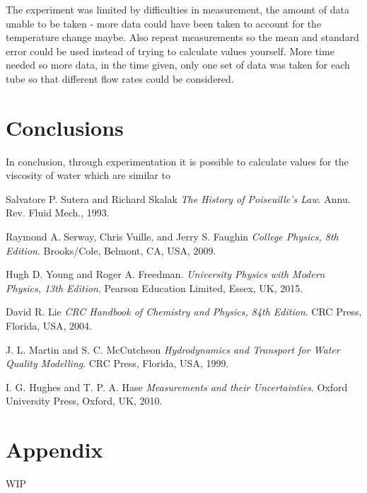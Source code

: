 \documentclass[twocolumn]{revtex4}
\begin{document}
The experiment was limited by difficulties in measurement, the amount of data unable to be taken - more data could have been taken to account for the temperature change maybe. Also repeat measurements so the mean and standard error could be used instead of trying to calculate values yourself. More time needed so more data, in the time given, only one set of data was taken for each tube so that different flow rates could be considered. 

\vspace{-5ex}
\section{Conclusions}
\vspace{-2ex}
 
In conclusion, through experimentation it is possible to calculate values for the viscosity of water which are similar to 

\begin{thebibliography}{5}
	Salvatore P. Sutera and Richard Skalak
	\textit{The History of Poiseuille's Law}.
	Annu. Rev. Fluid Mech., 1993.
	
	Raymond A. Serway, Chris Vuille, and Jerry S. Faughin
	\textit{College Physics, 8th Edition}.
	Brooks/Cole, Belmont, CA, USA, 2009.

	Hugh D. Young and Roger A. Freedman.
	\textit{University Physics with Modern Physics, 13th Edition}. 
	Pearson Education Limited, Essex, UK, 2015.
	
	David R. Lie
	\textit{CRC Handbook of Chemistry and Physics, 84th Edition}. 
	CRC Press, Florida, USA, 2004.
	
	J. L. Martin and S. C. McCutcheon
	\textit{Hydrodynamics and Transport for Water Quality Modelling}. 
	CRC Press, Florida, USA, 1999.
	
	I. G. Hughes and T. P. A. Hase
	\textit{Measurements and their Uncertainties}. 
	Oxford University Press, Oxford, UK, 2010.
	
\end{thebibliography}
\clearpage

\vfill
\twocolumngrid
\vspace{-3ex}
\section*{Appendix}
\vspace{-2ex}

WIP

\clearpage
\end{document}
